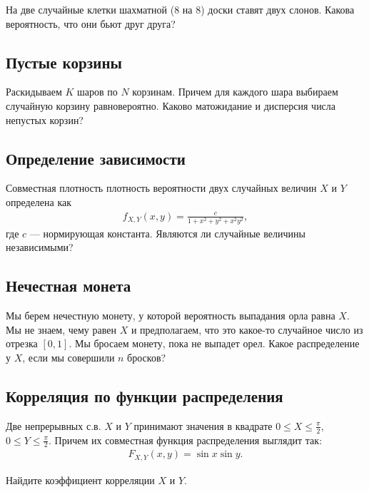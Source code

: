 \documentclass[12pt]{article}
\begin{document}
На две случайные клетки шахматной (8 на 8) доски ставят двух слонов. Какова вероятность, что они бьют друг друга?



\subsection{Пустые корзины}

Раскидываем $K$ шаров по $N$ корзинам. Причем для каждого шара выбираем случайную корзину равновероятно. Каково матожидание и дисперсия числа непустых корзин?



\subsection{Определение зависимости}

Совместная плотность плотность вероятности двух случайных величин $X$ и $Y$ определена как
\begin{align*}
    f_{X, Y}(x, y) = \frac{c}{1 + x^2 + y^2 + x^2y^2},
\end{align*}
где $c$ --- нормирующая константа. Являются ли случайные величины независимыми?



\subsection{Нечестная монета}

Мы берем нечестную монету, у которой вероятность выпадания орла равна $X$. Мы не знаем, чему равен $X$ и предполагаем, что это какое-то случайное число из отрезка $[0, 1]$. Мы бросаем монету, пока не выпадет орел. Какое распределение у $X$, если мы совершили $n$ бросков?



\subsection{Корреляция по функции распределения}

Две непрерывных с.в. $X$ и $Y$ принимают значения в квадрате $0 \le X \le \frac{\pi}{2},$ $0 \le Y \le \frac{\pi}{2}$. Причем их совместная функция распределения выглядит так:
\begin{align*}
    F_{X, Y} (x, y) = \sin x \sin y.
\end{align*}

Найдите коэффициент корреляции $X$ и $Y$.
\end{document}
